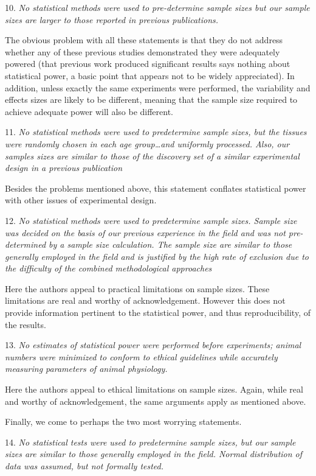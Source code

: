 \documentclass[a4paper,11pt]{article}
\begin{document}
10. {\em No statistical methods were used to pre-determine sample sizes
  but our sample sizes are larger to those reported in previous
  publications.}

The obvious problem with all these statements is that they do not
address whether any of these previous studies demonstrated they were
adequately powered (that previous work produced significant results
says nothing about statistical power, a basic point that appears not
to be widely appreciated).  In addition, unless exactly the same
experiments were performed, the variability and effects sizes are
likely to be different, meaning that the sample size required to
achieve adequate power will also be different.

11. {\em No statistical methods were used to predetermine sample sizes,
  but the tissues were randomly chosen in each age group\ldots and
  uniformly processed. Also, our samples sizes are similar to those of
  the discovery set of a similar experimental design in a previous
  publication}

Besides the problems mentioned above, this statement conflates statistical
power with other issues of experimental design.

12. {\em No statistical methods were used to predetermine sample
  sizes. Sample size was decided on the basis of our previous
  experience in the field and was not pre-determined by a sample size
  calculation. The sample size are similar to those generally employed
  in the field and is justified by the high rate of exclusion due to
  the difficulty of the combined methodological approaches}

Here the authors appeal to practical limitations on sample
sizes. These limitations are real and worthy of
acknowledgement. However this does not provide information
pertinent to the statistical power, and thus reproducibility, of the
results.

13. {\em No estimates of statistical power were performed before
  experiments; animal numbers were minimized to conform to ethical
  guidelines while accurately measuring parameters of animal
  physiology.}

Here the authors appeal to ethical limitations on sample sizes. Again,
while real and worthy of acknowledgement, the same arguments apply as
mentioned above.

Finally, we come to  perhaps the two most worrying statements. 

14. {\em No statistical tests were used to predetermine sample sizes, but
  our sample sizes are similar to those generally employed in the
  field. Normal distribution of data was assumed, but not formally
  tested.}
\end{document}
